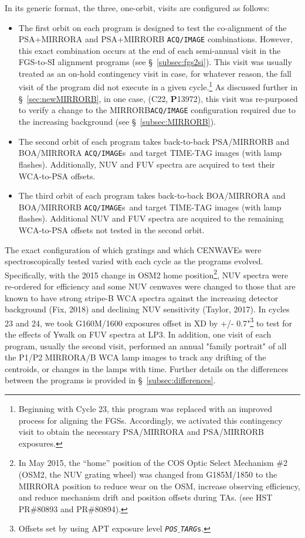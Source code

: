 In its generic format, the three, one-orbit, visits are configured as follows:
\begin{itemize}
	\item{The first orbit on each program is designed to test the co-alignment of the PSA+MIRRORA and PSA+MIRRORB \texttt{ACQ/IMAGE} combinations.
However, this exact combination occurs at the end of each semi-annual visit in the FGS-to-SI alignment programs (see \S~\ref{subsec:fgs2si}).
This visit was usually treated as an on-hold contingency visit in case, for whatever reason, the fall visit of the program did not execute in a given cycle.\footnote{Beginning with Cycle 23, this program
was replaced with an improved process for aligning the FGSs. Accordingly,  we activated this contingency visit to obtain the necessary PSA/MIRRORA and PSA/MIRRORB exposures.}
As discussed further in \S~\ref{sec:newMIRRORB}, in one case, (C22, {\bf P}13972), this visit was re-purposed to verify a change to the MIRRORB\texttt{ACQ/IMAGE} configuration required due to the increasing background (see \S~\ref{subsec:MIRRORB}).}
	\item{The second orbit of each program takes back-to-back PSA/MIRRORB and BOA/MIRRORA \texttt{ACQ/IMAGE}s~and target TIME-TAG images (with lamp flashes). Additionally, NUV and FUV spectra are acquired to test their WCA-to-PSA offsets.}
	\item{The third orbit of each program takes back-to-back BOA/MIRRORA and BOA/MIRRORB \texttt{ACQ/IMAGE}s~and target TIME-TAG images (with lamp flashes). Additional NUV and FUV spectra are acquired to the remaining WCA-to-PSA offsets not tested in the second orbit.}
\end{itemize}
The exact configuration of which gratings and which CENWAVEs were spectroscopically tested varied with each cycle as the programs evolved.
Specifically, with the 2015 change in OSM2 home position\footnote{In May 2015, the ``home'' position of the COS Optic Select Mechanism \#2 (OSM2, the NUV grating wheel) was changed from G185M/1850 to the MIRRORA position to reduce wear on the OSM, increase observing efficiency, and reduce mechanism drift and position offsets during  TAs. (see HST PR\#80893 and PR\#80894).}, NUV spectra were re-ordered for efficiency and some NUV cenwaves were changed to those
that are known to have strong stripe-B WCA spectra against the increasing detector background (Fix, 2018) and declining NUV sensitivity (Taylor, 2017).
In cycles 23 and 24, we took G160M/1600 exposures offset in XD by  +/- 0.7"\footnote{Offsets set by using APT exposure level \texttt{{\it POS$\_$TARG}s}.} to test for the effects of Ywalk on FUV spectra at LP3.
In addition, one visit of each program, usually the second visit, performed an annual "family portrait"  of all the P1/P2 MIRRORA/B WCA lamp images to track any drifting of the centroids, or changes in the lamps with time.
Further details on the differences between the programs is provided in \S~\ref{subsec:differences}.

